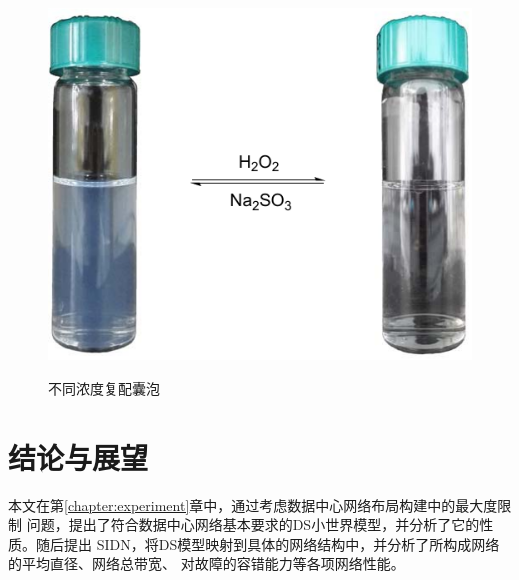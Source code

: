 \documentclass[bachelor,fandolfonts,replaceperiod]{jnuthesis} %
\begin{document}
    \begin{figure}[htbp]
        \centering
        \includegraphics[]{Figure/redox.pdf}\\
        \caption{不同浓度复配囊泡}\label{fig:vesicle-concentration}
    \end{figure}
    \chapter{结论与展望}\label{chapter:concludes}
    
    本文在第\ref{chapter:experiment}章中，通过考虑数据中心网络布局构建中的最大度限制
    问题，提出了符合数据中心网络基本要求的DS小世界模型，并分析了它的性质。随后提出
    SIDN，将DS模型映射到具体的网络结构中，并分析了所构成网络的平均直径、网络总带宽、
    对故障的容错能力等各项网络性能。
    
    \zhlipsum[1-3]
    
\end{document}

